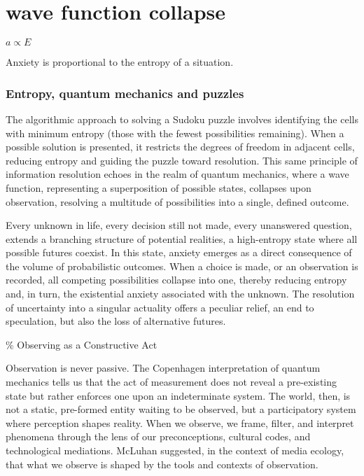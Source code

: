 \chapter*{wave function collapse}
\begin{center}
\vspace{2cm}
\begin{flushright}
\large
\textit{ $a \propto E$ }
\end{flushright}
\vspace{2cm}
\end{center}
\normalsize

Anxiety is proportional to the entropy of a situation. 

\newpage  %
\subsection*{ Entropy, quantum mechanics and puzzles} 

% 
The algorithmic approach to solving a Sudoku puzzle involves identifying the cells with minimum entropy (those with the fewest possibilities remaining). When a possible solution is presented, it restricts the degrees of freedom in adjacent cells, reducing entropy and guiding the puzzle toward resolution. This same principle of information resolution echoes in the realm of quantum mechanics, where a wave function, representing a superposition of possible states, collapses upon observation, resolving a multitude of possibilities into a single, defined outcome.

Every unknown in life, every decision still not made, every unanswered question, extends a branching structure of potential realities, a high-entropy state where all possible futures coexist. In this state, anxiety emerges as a direct consequence of the volume of probabilistic outcomes. When a choice is made, or an observation is recorded, all competing possibilities collapse into one, thereby reducing entropy and, in turn, the existential anxiety associated with the unknown. The resolution of uncertainty into a singular actuality offers a peculiar relief, an end to speculation, but also the loss of alternative futures.

{\scriptsize \textcolor{comment}{\%  Observing as a Constructive Act }}

Observation is never passive.  The Copenhagen interpretation of quantum mechanics tells us that the act of measurement does not reveal a pre-existing state but rather enforces one upon an indeterminate system. The world, then, is not a static, pre-formed entity waiting to be observed, but a participatory system where perception shapes reality. When we observe, we frame, filter, and interpret phenomena through the lens of our preconceptions, cultural codes, and technological mediations. McLuhan suggested, in the context of media ecology, that what we observe is shaped by the tools and contexts of observation. \citep{mcluhan1964}

